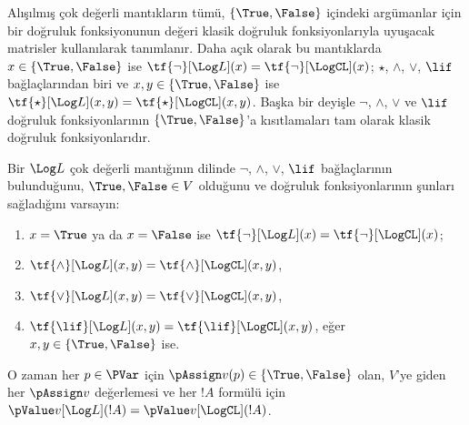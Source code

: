 \documentclass[../../../include/open-logic-section]{subfiles}
\begin{document}


Alışılmış çok değerli mantıkların tümü, $\{\True,\False\}$ içindeki
argümanlar için bir doğruluk fonksiyonunun değeri klasik doğruluk
fonksiyonlarıyla uyuşacak matrisler kullanılarak tanımlanır. Daha açık olarak
bu mantıklarda $x\in\{\True,\False\}$ ise
$\tf{\lnot}[\Log L](x)=\tf{\lnot}[\LogCL](x)$; $\star$, $\land$, $\lor$,
$\lif$ bağlaçlarından biri ve $x,y\in\{\True,\False\}$ ise
$\tf{\star}[\Log L](x,y)=\tf{\star}[\LogCL](x,y)$. Başka bir deyişle
$\lnot$, $\land$, $\lor$ ve $\lif$ doğruluk fonksiyonlarının
$\{\True,\False\}$'a kısıtlamaları tam olarak klasik doğruluk
fonksiyonlarıdır.

\begin{prop}
  Bir $\Log L$ çok değerli mantığının dilinde $\lnot$, $\land$, $\lor$,
  $\lif$ bağlaçlarının bulunduğunu, $\True,\False\in V$ olduğunu ve doğruluk
  fonksiyonlarının şunları sağladığını varsayın:
  \begin{enumerate}
    \item{} $x=\True$ ya da $x=\False$ ise
    $\tf{\lnot}[\Log L](x)=\tf{\lnot}[\LogCL](x)$;
    \item{} $\tf{\land}[\Log L](x,y)=\tf{\land}[\LogCL](x,y)$,
    \item{} $\tf{\lor}[\Log L](x,y)=\tf{\lor}[\LogCL](x,y)$,
    \item{} $\tf{\lif}[\Log L](x,y)=\tf{\lif}[\LogCL](x,y)$,
    eğer $x,y\in\{\True,\False\}$ ise.
  \end{enumerate}
  O zaman her $p\in\PVar$ için $\pAssign v(p)\in\{\True,\False\}$ olan,
  $V$'ye giden her $\pAssign v$ değerlemesi ve her $!A$ formülü için
  $\pValue v[\Log L](!A)=\pValue v[\LogCL](!A)$.
\end{prop}
\end{document}
